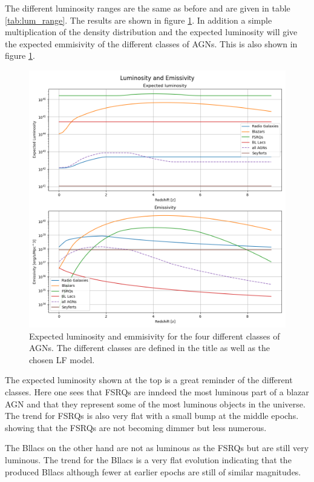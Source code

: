 \documentclass{article}
\begin{document}
The different luminosity ranges are the same as before and are given in table \ref{tab:lum_range}. The results are shown in figure \ref{fig:EL}.
In addition a simple multiplication of the density distribution and the expected luminosity will give the expected emmisivity of the different classes of AGNs. This is also shown in figure \ref{fig:EL}.

\begin{figure}
    \centering
    \includegraphics[width = \textwidth]{new_plots/Luminosity and Emissivity.png}
    \caption{Expected luminosity and emmisivity for the four different classes of AGNs. The different classes are defined in the title as well as the chosen LF model.}
    \label{fig:EL}
\end{figure}

The expected luminosity shown at the top is a great reminder of the different classes. Here one sees that FSRQs are inndeed the most luminous part of a blazar AGN and 
that they represent some of the most luminous objects in the universe. The trend for FSRQs is also very flat with a small bump at the middle epochs. showing that the FSRQs are not becoming dimmer but less numerous.

The Bllacs on the other hand are not as luminous as the FSRQs but are still very luminous. 
The trend for the Bllacs is a very flat evolution indicating that the produced Bllacs although fewer at earlier epochs are still 
of similar magnitudes.
\end{document}
